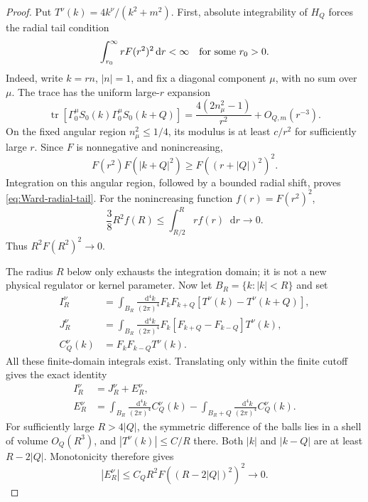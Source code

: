 \documentclass[final,5p,times,twocolumn,numbers,nopreprintline]{elsarticle}
\numberwithin{equation}{section}
\theoremstyle{definition}
\theoremstyle{remark}
\newcommand{\dd}{\mathop{}\!\mathrm d}
\newcommand{\Tr}{\operatorname{tr}}
\begin{document}
\begin{proof}
Put \(T^\nu(k)=4k^\nu/(k^2+m^2)\).
First, absolute integrability of \(H_Q\) forces the radial tail
condition
\begin{equation}
 \int_{r_0}^{\infty}rF(r^2)^2\dd r<\infty
 \quad\hbox{for some }r_0>0.
 \label{eq:Ward-radial-tail}
\end{equation}
Indeed, write \(k=rn\), \(|n|=1\), and fix a diagonal component
\(\mu\), with no sum over \(\mu\). The trace has the uniform
large-\(r\) expansion
\[
 \Tr[\Gamma_0^\mu S_0(k)\Gamma_0^\mu S_0(k+Q)]
 =\frac{4(2n_\mu^2-1)}{r^2}+O_{Q,m}(r^{-3}).
\]
On the fixed angular region \(n_\mu^2\leq1/4\), its modulus is at
least \(c/r^2\) for sufficiently large \(r\).
Since \(F\) is nonnegative and nonincreasing,
\[
 F(r^2)F(|k+Q|^2)\geq F((r+|Q|)^2)^2.
\]
Integration on this angular region, followed by a bounded radial
shift, proves \eqref{eq:Ward-radial-tail}.
For the nonincreasing function \(f(r)=F(r^2)^2\),
\[
 \frac38R^2f(R)
 \leq\int_{R/2}^{R}rf(r)\dd r\longrightarrow0.
\]
Thus \(R^2F(R^2)^2\to0\).

The radius \(R\) below only exhausts the integration domain; it
is not a new physical regulator or kernel parameter.
Now let \(B_R=\{k:|k|<R\}\) and set
\begin{align*}
 I_R^\nu
 &=\int_{B_R}\frac{\dd^4k}{(2\pi)^4}
       F_kF_{k+Q}[T^\nu(k)-T^\nu(k+Q)],\\
 J_R^\nu
 &=\int_{B_R}\frac{\dd^4k}{(2\pi)^4}
       F_k[F_{k+Q}-F_{k-Q}]T^\nu(k),\\
 C_Q^\nu(k)&=F_kF_{k-Q}T^\nu(k).
\end{align*}
All these finite-domain integrals exist. Translating only within
the finite cutoff gives the exact identity
\begin{align}
 I_R^\nu&=J_R^\nu+E_R^\nu,\nonumber\\
 E_R^\nu
 &=\int_{B_R}\frac{\dd^4k}{(2\pi)^4}C_Q^\nu(k)
   -\int_{B_R+Q}\frac{\dd^4k}{(2\pi)^4}C_Q^\nu(k).
 \label{eq:Ward-finite-cutoff}
\end{align}
For sufficiently large \(R>4|Q|\), the symmetric difference of the balls lies in
a shell of volume \(O_Q(R^3)\), and \(|T^\nu(k)|\leq C/R\)
there. Both \(|k|\) and \(|k-Q|\) are at least
\(R-2|Q|\). Monotonicity therefore gives
\begin{equation}
 |E_R^\nu|
 \leq C_QR^2F((R-2|Q|)^2)^2
 \longrightarrow0.
 \label{eq:Ward-boundary-error}
\end{equation}


\end{proof}
\end{document}
